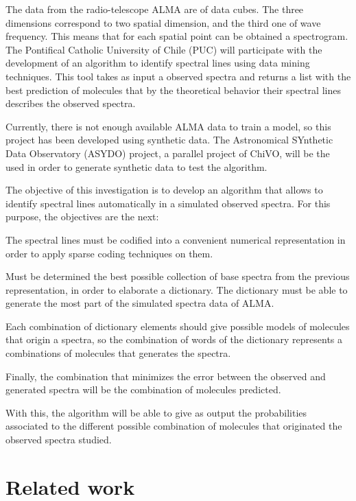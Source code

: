 \documentclass[twocolumn, draft]{emulateapj}
\begin{document}
The data from the radio-telescope ALMA are of data cubes. The three dimensions correspond to two spatial dimension, and the third one of wave frequency. This means that for each spatial point can be obtained a spectrogram. The Pontifical Catholic University of Chile (PUC) will participate with the development of an algorithm to identify spectral lines using data mining techniques. This tool takes as input a observed spectra and returns a list with the best prediction of molecules that by the theoretical behavior their spectral lines describes the observed spectra.

Currently, there is not enough available ALMA data to train a model, so this project has been developed using synthetic data.
The Astronomical SYnthetic Data Observatory (ASYDO) project, a parallel project of ChiVO, will be the used in order to generate synthetic data to test the algorithm.

The objective of this investigation is to develop an algorithm that allows to identify spectral lines automatically in a simulated observed spectra. 
For this purpose, the objectives are the next:

The spectral lines must be codified into a convenient numerical representation in order to apply sparse coding techniques on them.

Must be determined the best possible collection of base spectra from the previous representation, in order to elaborate a dictionary.
The dictionary must be able to generate the most part of the simulated spectra data of ALMA.

Each combination of dictionary elements should give possible models of molecules that origin a spectra, so the combination of words of the dictionary represents a combinations of molecules that generates the spectra.

Finally, the combination that minimizes the error between the observed and generated spectra will be the combination of molecules predicted.

With this, the algorithm will be able to give as output the probabilities associated to the different possible combination of molecules that originated the observed spectra studied.

\section{Related work}
\label{sec:related}
\end{document}
